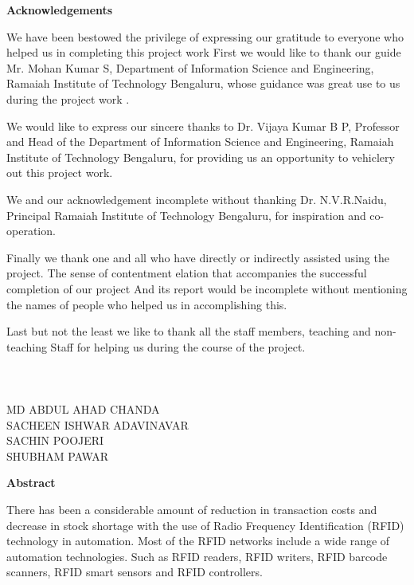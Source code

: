 \documentclass[12pt,a4paper]{report}
\begin{document}
	\rmfamily
	\begin{center}
		{\Large \textbf{ Acknowledgements }}\vspace{0.5cm}
	\end{center}
We have been bestowed the privilege of expressing our gratitude to everyone who helped us in completing this project work First we would like to thank our guide Mr. Mohan Kumar S, Department of Information Science and Engineering, Ramaiah Institute of Technology Bengaluru, whose guidance was great use to us during the project work .

We would like to express our sincere thanks to Dr. Vijaya Kumar B P, Professor and Head of the Department of Information Science and Engineering, Ramaiah Institute of
Technology Bengaluru, for providing us an opportunity to vehiclery out this project work.

We  and our acknowledgement incomplete without thanking Dr. N.V.R.Naidu, Principal  Ramaiah Institute of
Technology Bengaluru, for inspiration and co-operation.


Finally we thank one and all who have directly or indirectly assisted using the project. The sense of contentment elation that accompanies the successful completion of our project And its report would be incomplete without mentioning the names of people who helped us in accomplishing this.

Last but not the least we like to thank all the staff  members, teaching and non-teaching Staff  for helping us during the course of the project.
\\\\\\\vspace{2cm}\\
MD ABDUL AHAD CHANDA\\ 
SACHEEN ISHWAR ADAVINAVAR\\ 
SACHIN POOJERI\\
SHUBHAM PAWAR \\

\newpage
\begin{center}
	{\Large \textbf{Abstract}}\vspace{0.5cm}\\
\end{center}


	
	There has been a considerable amount of reduction in transaction costs and decrease
	in stock shortage with the use of Radio Frequency Identification (RFID) technology in
	automation. Most of the RFID networks include a wide range of automation
	technologies. Such as RFID readers, RFID writers, RFID barcode scanners, RFID
	smart sensors and RFID controllers.
	
\end{document}
